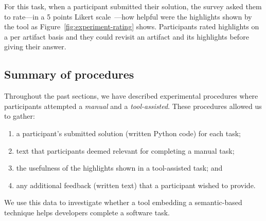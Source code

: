 For this task, when a participant submitted their solution, the survey asked them to 
rate---in a 5 points Likert scale~\cite{likert1932technique}---how helpful were the highlights shown by the tool as  Figure~\ref{fig:experiment-rating} shows.
Participants rated highlights on a per artifact basis
and they could revisit an artifact and its highlights before giving their answer.











\subsection{Summary of procedures}


Throughout the past sections, we have described experimental procedures 
where participants attempted a \textit{manual} and a \textit{tool-assisted}.
These procedures allowed us to gather:


\begin{enumerate}
\item a participant's submitted solution (written Python code) for each task;
\item text that participants deemed relevant for completing a manual task;
\item the usefulness of the highlights shown in a tool-assisted task; and
\item any additional feedback (written text) that a participant wished to provide.
\end{enumerate}


We use this data to investigate whether 
a tool embedding a semantic-based technique helps developers complete a software task. 


\clearpage



